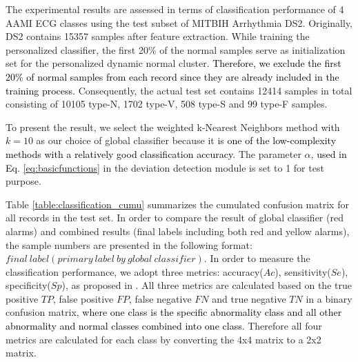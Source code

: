 The experimental results are assessed in terms of classification performance of 4 AAMI ECG classes using the test subset of MITBIH Arrhythmia DS2. Originally, DS2 contains 15357 samples after feature extraction. While training the personalized classifier, the first 20\% of the normal samples serve as initialization set for the personalized dynamic normal cluster. \textcolor{black}{Therefore, we exclude the first 20\% of normal samples from each record since they are already included in the training process.} Consequently, the actual test set contains 12414 samples in total consisting of 10105 type-N, 1702 type-V, 508 type-S and 99 type-F samples.

To present the result, we select the weighted k-Nearest Neighbors method with $k=10$ as our choice of global classifier because it is \textcolor{black}{one of the low-complexity methods with a relatively good classification accuracy\cite{hechenbichler2004weighted}. }%
The parameter $\alpha$, \textcolor{black}{used in Eq. \ref{eq:basicfunctions}} in the deviation detection module is set to 1 for test purpose. 


Table \ref{table:classification_cumu} summarizes the cumulated confusion matrix for all records in the test set. In order to compare the result of global classifier (red alarms) and combined results (final labels including both red and yellow alarms), the sample numbers are presented in the following format: $final~label(primary~label~by~global~ classifier)$. In order to measure the classification performance, we adopt three metrics: accuracy($Ac$), sensitivity($Se$), specificity($Sp$), as proposed in \cite{Hu_et_al,deChazal2006,ince2009generic}. All three metrics are calculated based on the true positive $TP$, false positive $FP$, false negative $FN$ and true negative $TN$ in a binary confusion matrix, \textcolor{black}{where one class is the specific abnormality class and all other abnormality and normal classes combined into one class}. Therefore all four metrics are calculated for each class by converting the 4x4 matrix to a 2x2 matrix.

